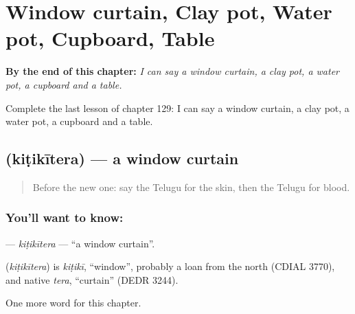 
\chapter{Window curtain, Clay pot, Water pot, Cupboard, Table}
\label{ch:te-window-curtain-clay-pot-water-pot-cupboard-table}

\begin{chapteropening}
\textbf{By the end of this chapter:} \emph{I can say a window curtain, a clay pot, a water pot, a cupboard and a table.}

Complete the last lesson of chapter 129: I can say a window curtain, a clay pot, a water pot, a cupboard and a table.
\end{chapteropening}

\section[\texorpdfstring{\te{కిటికీతెర} (kiṭikītera)}{కిటికీతెర (kiṭikītera)}]{ (kiṭikītera) — a window curtain}

\label{lesson:TE-C129-kitikitera}



\begin{quote}
Before the new one: say the Telugu for the skin, then the Telugu for blood.
\end{quote}

\subsection*{You'll want to know: }
\textbf{} — \emph{kiṭikītera} — \textquotedblleft{}a window curtain\textquotedblright{}.

\begin{cousinweb}
\textbf{} (\emph{kiṭikītera}) is \emph{kiṭikī}, \textquotedblleft{}window\textquotedblright{}, probably a loan from the north (CDIAL 3770), and native \emph{tera}, \textquotedblleft{}curtain\textquotedblright{} (DEDR 3244).
\end{cousinweb}

\begin{grammarlens}[title={What you've built}]
One more word for this chapter.
\end{grammarlens}


